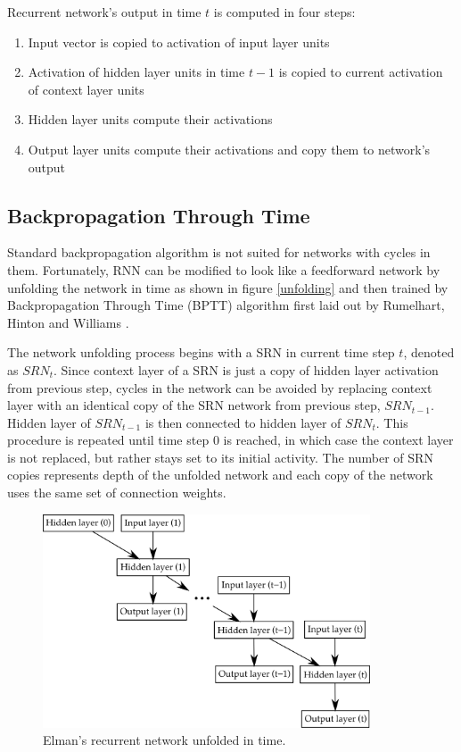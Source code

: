 \documentclass[12pt,oneside]{fithesis2}
\begin{document}
Recurrent network's output in time $t$ is computed in four steps:
\begin{enumerate}
	\item Input vector is copied to activation of input layer units
	\item Activation of hidden layer units in time $t-1$ is copied to current activation of context layer units
	\item Hidden layer units compute their activations
	\item Output layer units compute their activations and copy them to network's output
\end{enumerate}
	
\subsection{Backpropagation Through Time}
Standard backpropagation algorithm is not suited for networks with cycles in them. Fortunately, RNN can be modified to look like a feedforward network by unfolding the network in time as shown in figure \ref{unfolding} and then trained by Backpropagation Through Time (BPTT) algorithm first laid out by Rumelhart, Hinton and Williams \cite{rumelhart-hinton-williams}.\par

The network unfolding process begins with a SRN in current time step $t$, denoted as $SRN_t$. Since context layer of a SRN is just a copy of hidden layer activation from previous step, cycles in the network can be avoided by replacing context layer with an identical copy of the SRN network from previous step, $SRN_{t-1}$. Hidden layer of $SRN_{t-1}$ is then connected to hidden layer of $SRN_t$. This procedure is repeated until time step $0$ is reached, in which case the context layer is not replaced, but rather stays set to its initial activity. The number of SRN copies represents depth of the unfolded network and each copy of the network uses the same set of connection weights.\par

	\begin{figure}[ht]
		\centering
		\includegraphics[width=367px]{bptt2.png}
		\caption{Elman's recurrent network unfolded in time. }
		\label{unfolding}
		\label{fig:bptt}
	\end{figure}
\end{document}
